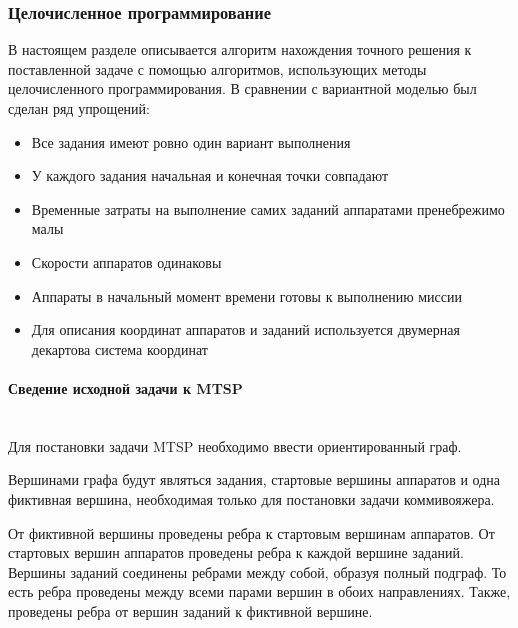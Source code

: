\documentclass[a4paper,14pt,russian]{article}
\begin{document}
\subsubsection{Целочисленное программирование}

В настоящем разделе описывается алгоритм нахождения точного решения к поставленной задаче с помощью алгоритмов, использующих методы целочисленного программирования. В сравнении с вариантной моделью был сделан ряд упрощений:


\begin{itemize}
\item Все задания имеют ровно один вариант выполнения
\item У каждого задания начальная и конечная точки совпадают
\item Временные затраты на выполнение самих заданий аппаратами пренебрежимо малы
\item Скорости аппаратов одинаковы
\item Аппараты в начальный момент времени готовы к выполнению миссии
\item Для описания координат аппаратов и заданий используется двумерная декартова система координат
\end{itemize}


\paragraph{Сведение исходной задачи к MTSP} ~\\

Для постановки задачи MTSP необходимо ввести ориентированный граф.

Вершинами графа будут являться задания, стартовые вершины аппаратов и одна фиктивная вершина, необходимая только для постановки задачи коммивояжера.

От фиктивной вершины проведены ребра к стартовым вершинам аппаратов. От стартовых вершин аппаратов проведены ребра к каждой вершине заданий. Вершины заданий соединены ребрами между собой, образуя полный подграф. То есть ребра проведены между всеми парами вершин в обоих направлениях. Также, проведены ребра от вершин заданий к фиктивной вершине.
\end{document}
